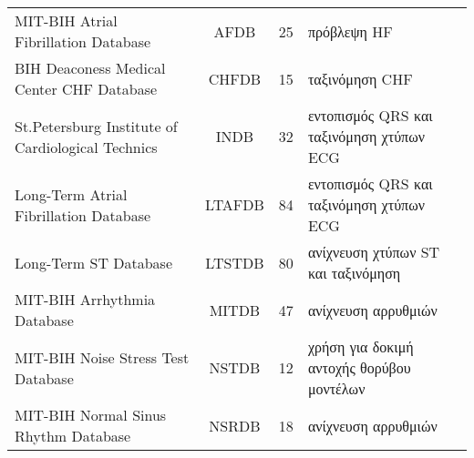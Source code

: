 \begin{sidewaystable}
\begin{tabular}{l c r l}
		MIT-BIH Atrial Fibrillation Database~\cite{moody1983new}                                                                             & AFDB              & 25                                                                             & πρόβλεψη HF                                                           \\
		BIH Deaconess Medical Center CHF Database~\cite{baim1986survival}                                                                    & CHFDB             & 15                                                                             & ταξινόμηση CHF                                                        \\
		St.Petersburg Institute of Cardiological Technics~\cite{goldberger2000physiobank}                                                    & INDB              & 32                                                                             & εντοπισμός QRS και ταξινόμηση χτύπων ECG                              \\
		Long-Term Atrial Fibrillation Database~\cite{petrutiu2007abrupt}                                                                     & LTAFDB            & 84                                                                             & εντοπισμός QRS και ταξινόμηση χτύπων ECG                              \\
		Long-Term ST Database~\cite{jager2003long}                                                                                           & LTSTDB            & 80                                                                             & ανίχνευση χτύπων ST και ταξινόμηση                                    \\
		MIT-BIH Arrhythmia Database~\cite{moody2001impact}                                                                                   & MITDB             & 47                                                                             & ανίχνευση αρρυθμιών                                                   \\
		MIT-BIH Noise Stress Test Database~\cite{moody1984noise}                                                                             & NSTDB             & 12                                                                             & χρήση για δοκιμή αντοχής θορύβου μοντέλων                             \\
		MIT-BIH Normal Sinus Rhythm Database~\cite{goldberger2000physiobank}                                                                 & NSRDB             & 18                                                                             & ανίχνευση αρρυθμιών                                                   \\

\end{tabular}
\end{sidewaystable}
